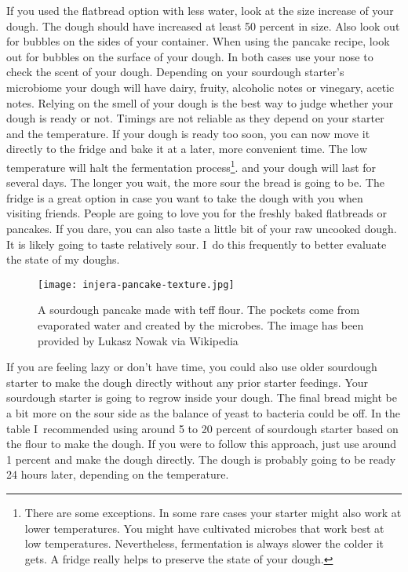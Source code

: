 If you used the flatbread option with less water, look at the size increase
of your dough. The dough should have increased at least 50 percent in size.
Also look out for bubbles on the sides of your container.
When using the pancake recipe, look out for bubbles on the surface of your dough.
In both cases use your nose to check the scent of your dough. Depending
on your sourdough starter's microbiome your dough will have
dairy, fruity, alcoholic notes or vinegary, acetic notes. Relying
on the smell of your dough is the best way to judge whether your
dough is ready or not. Timings are not reliable as they
depend on your starter and the temperature. If your dough
is ready too soon, you can now move it directly to the fridge and bake
it at a later, more convenient time. The low temperature will halt the fermentation
process\footnote{There are some exceptions. In some rare cases your starter
might also work at lower temperatures. You might have cultivated microbes that work best at
low temperatures. Nevertheless, fermentation
is always slower the colder it gets. A fridge really helps to preserve the state
of your dough.}.
and your dough will last for several days. The longer you wait, the more sour the
bread is going to be. The fridge is a great option in case you want to
take the dough with you when visiting friends. People are going
to love you for the freshly baked flatbreads or pancakes. If you dare,
you can also taste a little bit of your raw uncooked dough. It is likely
going to taste relatively sour. I~do this frequently to better evaluate the
state of my doughs.


\begin{figure}[htb!]
  \texttt{[image: injera-pancake-texture.jpg]}
  \centering
  \caption{A sourdough pancake made with teff flour. The pockets come from
  evaporated water and  created by the microbes.
  The image has been provided by Lukasz Nowak via Wikipedia}
\end{figure}

If you are feeling lazy or don't have time, you could also use older sourdough starter
to make the dough directly without any prior starter feedings. Your sourdough starter
is going to regrow inside your dough. The
final bread might be a bit more on the sour side as the balance of yeast to
bacteria could be off. In the table I~recommended using around 5 to 20 percent
of sourdough starter based on the flour to make the dough. If you were to follow
this approach, just use around 1 percent and make the dough directly.
The dough is probably going to be ready 24 hours later, depending on the temperature.

